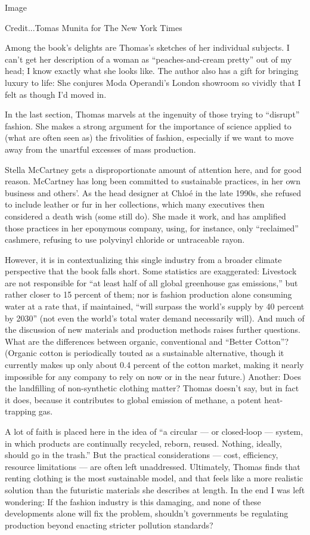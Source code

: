 Image

Credit...Tomas Munita for The New York Times

Among the book's delights are Thomas's sketches of her individual
subjects. I can't get her description of a woman as ``peaches-and-cream
pretty'' out of my head; I know exactly what she looks like. The author
also has a gift for bringing luxury to life: She conjures Moda
Operandi's London showroom so vividly that I felt as though I'd moved
in.

In the last section, Thomas marvels at the ingenuity of those trying to
``disrupt'' fashion. She makes a strong argument for the importance of
science applied to (what are often seen as) the frivolities of fashion,
especially if we want to move away from the unartful excesses of mass
production.

Stella McCartney gets a disproportionate amount of attention here, and
for good reason. McCartney has long been committed to sustainable
practices, in her own business and others'. As the head designer at
Chloé in the late 1990s, she refused to include leather or fur in her
collections, which many executives then considered a death wish (some
still do). She made it work, and has amplified those practices in her
eponymous company, using, for instance, only ``reclaimed'' cashmere,
refusing to use polyvinyl chloride or untraceable rayon.

However, it is in contextualizing this single industry from a broader
climate perspective that the book falls short. Some statistics are
exaggerated: Livestock are not responsible for ``at least half of all
global greenhouse gas emissions,'' but rather closer to 15 percent of
them; nor is fashion production alone consuming water at a rate that, if
maintained, ``will surpass the world's supply by 40 percent by 2030''
(not even the world's total water demand necessarily will). And much of
the discussion of new materials and production methods raises further
questions. What are the differences between organic, conventional and
``Better Cotton''? (Organic cotton is periodically touted as a
sustainable alternative, though it currently makes up only about 0.4
percent of the cotton market, making it nearly impossible for any
company to rely on now or in the near future.) Another: Does the
landfilling of non-synthetic clothing matter? Thomas doesn't say, but in
fact it does, because it contributes to global emission of methane, a
potent heat-trapping gas.

A lot of faith is placed here in the idea of ``a circular --- or
closed-loop --- system, in which products are continually recycled,
reborn, reused. Nothing, ideally, should go in the trash.'' But the
practical considerations --- cost, efficiency, resource limitations ---
are often left unaddressed. Ultimately, Thomas finds that renting
clothing is the most sustainable model, and that feels like a more
realistic solution than the futuristic materials she describes at
length. In the end I was left wondering: If the fashion industry is this
damaging, and none of these developments alone will fix the problem,
shouldn't governments be regulating production beyond enacting stricter
pollution standards?

